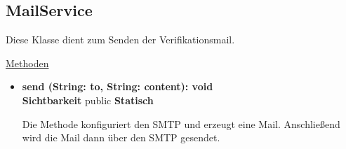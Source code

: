 \newpage
\subsection{MailService}\label{MailService}
Diese Klasse dient zum Senden der Verifikationsmail.


\underline{Methoden}
\begin{itemize}
\itemsep0pt
\item \textbf{send (String: to, String: content): void}\hfill\\
\textbf{Sichtbarkeit} public \newline
\textbf{Statisch}

Die Methode konfiguriert den SMTP und erzeugt eine Mail. Anschließend wird die Mail dann über den SMTP gesendet.

\end{itemize}
